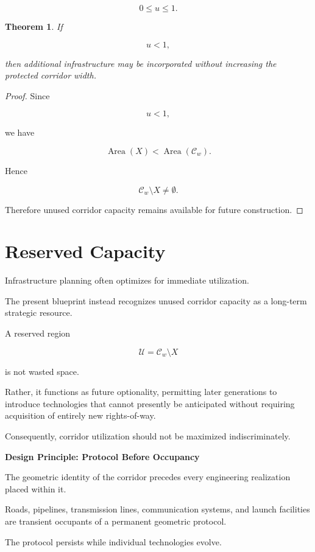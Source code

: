 \documentclass[11pt,fleqn]{book}
\numberwithin{equation}{chapter}
\newenvironment{principle}[1]
  {\begin{principleEnv}
   \noindent\textbf{Design Principle: #1}\par\smallskip\itshape}
  {\end{principleEnv}}
\theoremstyle{plain}
\newtheorem{theorem}{Theorem}[chapter]
\theoremstyle{definition}
\theoremstyle{remark}
\begin{document}
\[
0
\le
u
\le
1.
\]


\begin{theorem}

If

\[
u<1,
\]

then additional infrastructure may be incorporated without increasing
the protected corridor width.

\end{theorem}

\begin{proof}

Since

\[
u<1,
\]

we have

\[
\operatorname{Area}(X)
<
\operatorname{Area}(\mathcal C_w).
\]

Hence

\[
\mathcal C_w\setminus X
\neq\emptyset.
\]

Therefore unused corridor capacity remains available for future
construction.

\end{proof}


\section{Reserved Capacity}

Infrastructure planning often optimizes for immediate utilization.

The present blueprint instead recognizes unused corridor capacity as a
long-term strategic resource.

A reserved region

\[
\mathcal U
=
\mathcal C_w\setminus X
\]

is not wasted space.

Rather, it functions as future optionality, permitting later generations
to introduce technologies that cannot presently be anticipated without
requiring acquisition of entirely new rights-of-way.

Consequently, corridor utilization should not be maximized
indiscriminately.


\begin{principle}{Protocol Before Occupancy}

The geometric identity of the corridor precedes every engineering
realization placed within it.

Roads, pipelines, transmission lines, communication systems, and launch
facilities are transient occupants of a permanent geometric protocol.

The protocol persists while individual technologies evolve.

\end{principle}
\end{document}
